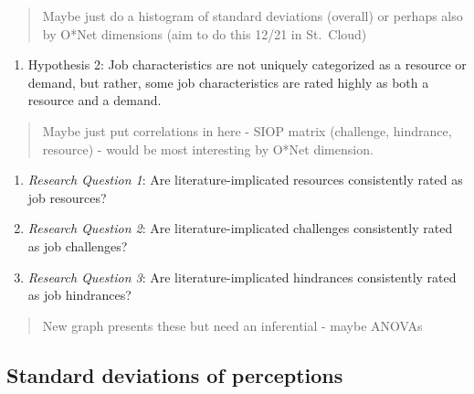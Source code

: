 \documentclass[
  man]{apa6}
\providecommand{\tightlist}{%
  \setlength{\itemsep}{0pt}\setlength{\parskip}{0pt}}
\begin{document}
\begin{quote}
Maybe just do a histogram of standard deviations (overall) or perhaps also by O*Net dimensions (aim to do this 12/21 in St.~Cloud)
\end{quote}

\begin{enumerate}
\def\labelenumi{\arabic{enumi}.}
\setcounter{enumi}{1}
\tightlist
\item
  Hypothesis 2: Job characteristics are not uniquely categorized as a resource or demand, but rather, some job characteristics are rated highly as both a resource and a demand.
\end{enumerate}

\begin{quote}
Maybe just put correlations in here - SIOP matrix (challenge, hindrance, resource) - would be most interesting by O*Net dimension.
\end{quote}

\begin{enumerate}
\def\labelenumi{\arabic{enumi}.}
\setcounter{enumi}{2}
\item
  \emph{Research Question 1}: Are literature-implicated resources consistently rated as job resources?
\item
  \emph{Research Question 2}: Are literature-implicated challenges consistently rated as job challenges?
\item
  \emph{Research Question 3}: Are literature-implicated hindrances consistently rated as job hindrances?
\end{enumerate}

\begin{quote}
New graph presents these but need an inferential - maybe ANOVAs
\end{quote}

\hypertarget{standard-deviations-of-perceptions}{%
\subsection{Standard deviations of perceptions}\label{standard-deviations-of-perceptions}}
\end{document}
